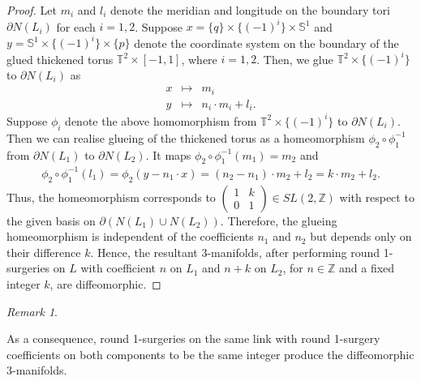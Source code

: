 \documentclass{amsart}
\theoremstyle{plain}
\theoremstyle{remark}
\newtheorem{rem}{Remark}
\theoremstyle{definition}
\newcommand{\s}{\mathbb{S}}
\newcommand{\dd}{\partial}
\begin{document}
\begin{proof}
   Let $m_i$ and $l_i$ denote the meridian and longitude on the boundary tori $\dd N(L_i)$ for each $i=1,2$.
    Suppose $x= \{q\} \times \{(-1)^i\} \times \s^1 $ and $y= \s^1 \times \{(-1)^i\} \times \{p\}$ denote the coordinate system on the boundary of the glued thickened torus $\mathbb{T}^2 \times [-1,1]$, where $i=1,2$.
    Then, we glue $\mathbb{T}^2 \times \{(-1)^i\}$ to $\dd N(L_i)$ as 
    \begin{eqnarray*}
        x &\mapsto &  m_i\\
        y &\mapsto & n_i\cdot m_i + l_i.
    \end{eqnarray*}
    Suppose $\phi_i$ denote the above homomorphism from $\mathbb{T}^2 \times \{(-1)^i\}$ to $\dd N(L_i)$. 
    Then we can realise glueing of the thickened torus as a homeomorphism $\phi_2\circ \phi_1^{-1}$ from $\dd N(L_1)$ to $\dd N(L_2)$. 
    It maps $\phi_2 \circ \phi_1^{-1}(m_1)=m_2$ and  
    \begin{eqnarray*}
    \phi_2\circ\phi_1^{-1}(l_1)= \phi_2(y-n_1 \cdot x)= (n_2-n_1)\cdot m_2 + l_2 = k \cdot m_2 + l_2.
    \end{eqnarray*}
    Thus, the homeomorphism corresponds to $\begin{pmatrix}
         1 & k \\
         0 & 1
    \end{pmatrix} \in SL(2, \mathbb{Z})$ with respect to the given basis on $\dd (N(L_1)\cup N(L_2))$.
    Therefore, the glueing homeomorphism is independent of the coefficients $n_1$ and $n_2$ but depends only on their difference $k$. 
    Hence, the resultant 3-manifolds, after performing round 1-surgeries on $L$ with coefficient $n$ on $L_{1}$ and $n+k$ on $L_2$, for $n\in \mathbb{Z}$ and a fixed integer $k$, are diffeomorphic.  
\end{proof}

\begin{rem}\label{rem: SameR1SC}

As a consequence, round 1-surgeries on the same link with round 1-surgery coefficients on both components to be the same integer produce the diffeomorphic 3-manifolds.
\end{rem}
\end{document}
